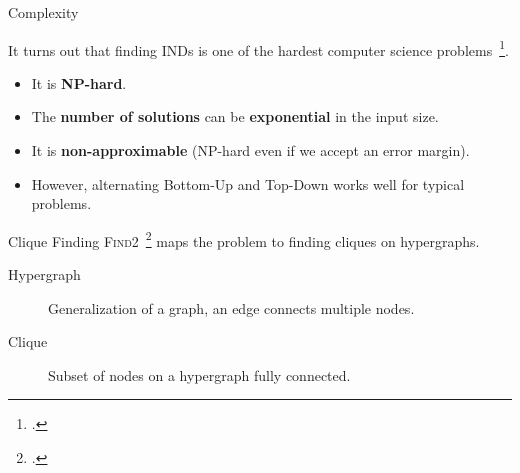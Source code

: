 \documentclass[10pt]{beamer}
\begin{document}
\begin{frame}{Complexity}

    It turns out that finding INDs is one of the hardest computer science
    problems~\footcite{Blsius2017}.
    
    \begin{itemize}
        \item It is \textbf{NP-hard}.
        \item The \textbf{number of solutions} can be \textbf{exponential} in the input size.
        \item It is \textbf{non-approximable} (NP-hard even if we accept an error margin).
        \item However, alternating Bottom-Up and Top-Down works well for
            typical problems.
    \end{itemize}
    
    \bigskip

\end{frame}

\begin{frame}{Clique Finding}
    \textsc{Find2}~\footcite{koeller2003discovery} maps the problem to finding cliques on hypergraphs.
    \begin{description}
        \item[Hypergraph] Generalization of a graph, an edge connects multiple nodes.
        \item[Clique] Subset of nodes on a hypergraph fully connected.
    \end{description}
\end{frame}
\end{document}
